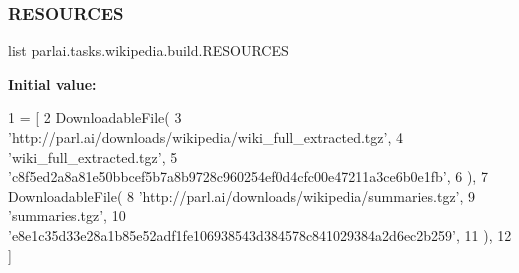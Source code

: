 \subsubsection{\texorpdfstring{R\+E\+S\+O\+U\+R\+C\+ES}{RESOURCES}}
{\footnotesize\ttfamily list parlai.\+tasks.\+wikipedia.\+build.\+R\+E\+S\+O\+U\+R\+C\+ES}

{\bfseries Initial value\+:}
\begin{DoxyCode}
1 =  [
2     DownloadableFile(
3         \textcolor{stringliteral}{'http://parl.ai/downloads/wikipedia/wiki\_full\_extracted.tgz'},
4         \textcolor{stringliteral}{'wiki\_full\_extracted.tgz'},
5         \textcolor{stringliteral}{'c8f5ed2a8a81e50bbcef5b7a8b9728c960254ef0d4cfc00e47211a3ce6b0e1fb'},
6     ),
7     DownloadableFile(
8         \textcolor{stringliteral}{'http://parl.ai/downloads/wikipedia/summaries.tgz'},
9         \textcolor{stringliteral}{'summaries.tgz'},
10         \textcolor{stringliteral}{'e8e1c35d33e28a1b85e52adf1fe106938543d384578c841029384a2d6ec2b259'},
11     ),
12 ]
\end{DoxyCode}
